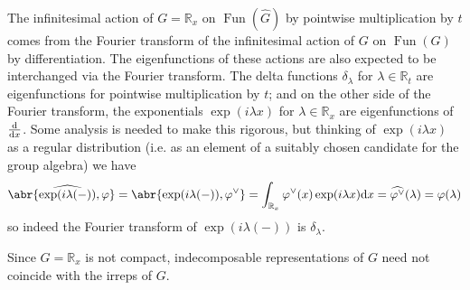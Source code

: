 \documentclass[11pt,leqno]{article}
\theoremstyle{plain}
\theoremstyle{definition}
\numberwithin{equation}{section}
\numberwithin{lem}{section}
\DeclareMathOperator{\Fun}{Fun}
\begin{document}
The infinitesimal action of $G = \mathbb R_x$ on $\Fun(\widehat G)$ by pointwise multiplication by $t$ comes from the Fourier transform of the infinitesimal action of $G$ on $\Fun(G)$ by differentiation. The eigenfunctions of these actions are also expected to be interchanged via the Fourier transform. The delta functions $\delta_\lambda$ for $\lambda\in\mathbb R_t$ are eigenfunctions for pointwise multiplication by $t$; and on the other side of the Fourier transform, the exponentials $\exp(i\lambda x)$ for $\lambda\in \mathbb R_x$ are eigenfunctions of $\dv{x}$. Some analysis is needed to make this rigorous, but thinking of $\exp(i\lambda x)$ as a regular distribution (i.e. as an element of a suitably chosen candidate for the group algebra) we have
\[\abr{\widehat{\exp(i\lambda(-))},\varphi} = \abr{\exp(i\lambda(-)), \varphi^\vee} = \int_{\mathbb R_x}\varphi^\vee(x)\exp(i\lambda x)\dd x = \widehat{\varphi^\vee}(\lambda) = \varphi(\lambda)\]
so indeed the Fourier transform of $\exp(i\lambda (-))$ is $\delta_\lambda$.

Since $G = \mathbb R_x$ is not compact, indecomposable representations of $G$ need not coincide with the irreps of $G$.


\end{document}
